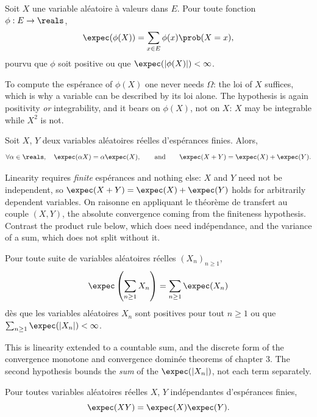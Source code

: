 \begin{theorem}
  Soit $X$ une variable aléatoire à valeurs dans $E$. Pour toute fonction
  $\phi : E \to \reals$,
  \[ \expec(\phi(X)) = \sum_{x \in E} \phi(x) \prob(X = x), \]
  pourvu que $\phi$ soit positive ou que $\expec(|\phi(X)|) < \infty$.
\end{theorem}

To compute the espérance of $\phi(X)$ one never needs $\Omega$: the loi of $X$
suffices, which is why a variable can be described by its loi alone. The
hypothesis is again positivity \emph{or} integrability, and it bears on
$\phi(X)$, not on $X$: $X$ may be integrable while $X^{2}$ is not.

\begin{corollary}[Linéarité]
  Soit $X$, $Y$ deux variables aléatoires réelles d'espérances finies. Alors,
  \[ \forall \alpha \in \reals, \quad \expec(\alpha X) = \alpha \expec(X),
     \qquad \text{and} \qquad
     \expec(X+Y) = \expec(X) + \expec(Y). \]
\end{corollary}

\begin{remark}
  Linearity requires \emph{finite} espérances and nothing else: $X$ and $Y$ need
  not be independent, so $\expec(X+Y) = \expec(X) + \expec(Y)$ holds for
  arbitrarily dependent variables. On raisonne en appliquant le théorème de
  transfert au couple $(X,Y)$, the absolute convergence coming from the
  finiteness hypothesis. Contrast the product rule below, which does need
  indépendance, and the variance of a sum, which does not split without it.
\end{remark}

\begin{prop}
  Pour toute suite de variables aléatoires réelles $(X_{n})_{n \ge 1}$,
  \[ \expec\left( \sum_{n \ge 1} X_{n} \right) = \sum_{n \ge 1} \expec(X_{n}) \]
  dès que les variables aléatoires $X_{n}$ sont positives pour tout $n \ge 1$ ou
  que $\sum_{n \ge 1} \expec(|X_{n}|) < \infty$.
\end{prop}

This is linearity extended to a countable sum, and the discrete form of the
convergence monotone and convergence dominée theorems of chapter 3. The second
hypothesis bounds the \emph{sum} of the $\expec(|X_{n}|)$, not each term
separately.

\begin{prop}
  Pour toutes variables aléatoires réelles $X$, $Y$ indépendantes d'espérances
  finies,
  \[ \expec(XY) = \expec(X)\expec(Y). \]
\end{prop}

